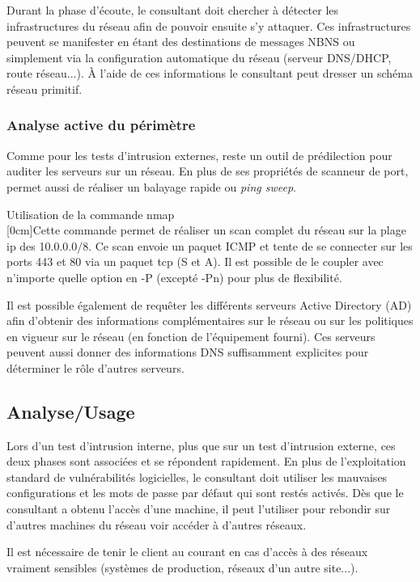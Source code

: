 \documentclass[twoside,a4paper,12pt,titlepage]{book}
\newcommand{\MarginPar}[2]{\marginnote{\scriptsize #1}[#2]}
\begin{document}
	Durant la phase d'écoute, le consultant doit chercher à détecter les infrastructures du réseau afin de pouvoir ensuite s'y attaquer. Ces infrastructures peuvent se manifester en étant des destinations de messages NBNS ou simplement via la configuration automatique du réseau (serveur DNS/DHCP, route réseau...). À l'aide de ces informations le consultant peut dresser un schéma réseau primitif.

\subsubsection{Analyse active du périmètre}
	Comme pour les tests d'intrusion externes,  reste un outil de prédilection pour auditer les serveurs sur un réseau. En plus de ses propriétés de scanneur de port,  permet aussi de réaliser un balayage rapide ou \textit{ping sweep}.
\begin{FlagConsole}{Utilisation de la commande nmap}
	\\
	\tcblower
	\MarginPar{\textbf{Ping Sweep}}{0cm}Cette commande permet de réaliser un scan complet du réseau sur la plage ip des 10.0.0.0/8. Ce scan envoie un paquet ICMP et tente de se connecter sur les ports 443 et 80 via un paquet tcp (S et A). Il est possible de le coupler avec n'importe quelle option en -P (excepté -Pn) pour plus de flexibilité.
\end{FlagConsole}

Il est possible également de requêter les différents serveurs Active Directory (AD) afin d'obtenir des informations complémentaires sur le réseau ou sur les politiques en vigueur sur le réseau (en fonction de l'équipement fourni). Ces serveurs peuvent aussi donner des informations DNS suffisamment explicites pour déterminer le rôle d'autres serveurs.

\subsection{Analyse/Usage}
	Lors d'un test d'intrusion interne, plus que sur un test d'intrusion externe, ces deux phases sont associées et se répondent rapidement. En plus de l'exploitation standard de vulnérabilités logicielles, le consultant doit utiliser les mauvaises configurations et les mots de passe par défaut qui sont restés activés. Dès que le consultant a obtenu l'accès d'une machine, il peut l'utiliser pour rebondir sur d'autres machines du réseau voir accéder à d'autres réseaux.
	\begin{Warning}
		Il est nécessaire de tenir le client au courant en cas d'accès à des réseaux vraiment sensibles (systèmes de production, réseaux d'un autre site...).
	\end{Warning}
\end{document}
